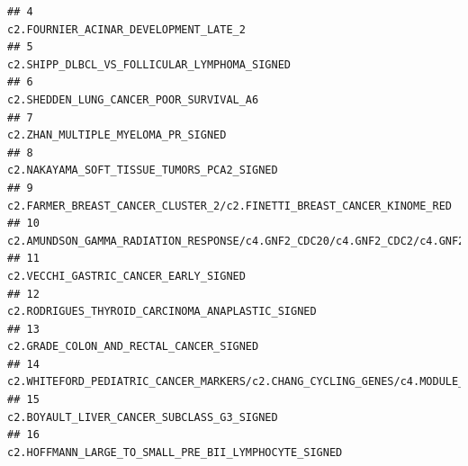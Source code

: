 \documentclass{article}\usepackage[]{graphicx}\usepackage[]{color}
\makeatletter
\newenvironment{kframe}{%
 \def\at@end@of@kframe{}%
 \ifinner\ifhmode%
  \def\at@end@of@kframe{\end{minipage}}%
  \begin{minipage}{\columnwidth}%
 \fi\fi%
 \def\FrameCommand##1{\hskip\@totalleftmargin \hskip-\fboxsep
 \colorbox{shadecolor}{##1}\hskip-\fboxsep
     \hskip-\linewidth \hskip-\@totalleftmargin \hskip\columnwidth}%
 \MakeFramed {\advance\hsize-\width
   \@totalleftmargin\z@ \linewidth\hsize
   \@setminipage}}%
 {\par\unskip\endMakeFramed%
 \at@end@of@kframe}
\newenvironment{knitrout}{}{} %
\makeatother
\begin{document}
\begin{knitrout}
\begin{kframe}
\begin{verbatim}
## 4                                                                                                                                                                              c2.FOURNIER_ACINAR_DEVELOPMENT_LATE_2
## 5                                                                                                                                                                       c2.SHIPP_DLBCL_VS_FOLLICULAR_LYMPHOMA_SIGNED
## 6                                                                                                                                                                            c2.SHEDDEN_LUNG_CANCER_POOR_SURVIVAL_A6
## 7                                                                                                                                                                                 c2.ZHAN_MULTIPLE_MYELOMA_PR_SIGNED
## 8                                                                                                                                                                         c2.NAKAYAMA_SOFT_TISSUE_TUMORS_PCA2_SIGNED
## 9                                                                                                                                              c2.FARMER_BREAST_CANCER_CLUSTER_2/c2.FINETTI_BREAST_CANCER_KINOME_RED
## 10                                                  c2.AMUNDSON_GAMMA_RADIATION_RESPONSE/c4.GNF2_CDC20/c4.GNF2_CDC2/c4.GNF2_CENPE/c4.GNF2_CENPF/c4.GNF2_CCNA2/c4.GNF2_CCNB2/c4.GNF2_H2AFX/c4.GNF2_HMMR/c4.GNF2_MKI67
## 11                                                                                                                                                                             c2.VECCHI_GASTRIC_CANCER_EARLY_SIGNED
## 12                                                                                                                                                                  c2.RODRIGUES_THYROID_CARCINOMA_ANAPLASTIC_SIGNED
## 13                                                                                                                                                                           c2.GRADE_COLON_AND_RECTAL_CANCER_SIGNED
## 14                                                                                                                            c2.WHITEFORD_PEDIATRIC_CANCER_MARKERS/c2.CHANG_CYCLING_GENES/c4.MODULE_54/c4.MODULE_57
## 15                                                                                                                                                                        c2.BOYAULT_LIVER_CANCER_SUBCLASS_G3_SIGNED
## 16                                                                                                                                                              c2.HOFFMANN_LARGE_TO_SMALL_PRE_BII_LYMPHOCYTE_SIGNED

\end{verbatim}
\end{kframe}
\end{knitrout}
\end{document}
